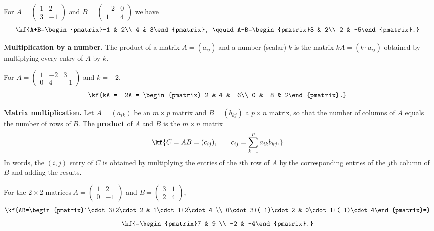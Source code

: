 \vspace{3pt}
\begin{misol}
For $A=\begin{pmatrix}1 & 2\\ 3 & -1\end{pmatrix}$ and
$B=\begin{pmatrix}-2 & 0\\ 1 & 4\end{pmatrix}$ we have
\[\kf{A+B=\begin{pmatrix}-1 & 2\\ 4 & 3\end{pmatrix}, \qquad
A-B=\begin{pmatrix}3 & 2\\ 2 & -5\end{pmatrix}.}\]
\end{misol}
\textbf{Multiplication by a number.}
The product of a matrix $A=(a_{ij})$ and a number (scalar) $k$ is the matrix
$kA=(k\cdot a_{ij})$ obtained by multiplying every entry of $A$ by $k$.
\vspace{3pt}
\begin{misol}
For $A=\begin{pmatrix}1 & -2 & 3\\ 0 & 4 & -1\end{pmatrix}$ and $k=-2$,
\[\kf{kA = -2A = \begin{pmatrix}-2 & 4 & -6\\ 0 & -8 & 2\end{pmatrix}.}\]
\end{misol}
\textbf{Matrix multiplication.}
Let $A=(a_{ik})$ be an $m\times p$ matrix and $B=(b_{kj})$ a $p\times n$ matrix,
so that the number of columns of $A$ equals the number of rows of $B$.
The \textbf{product} of $A$ and $B$ is the $m\times n$ matrix
\[\kf{C = AB = (c_{ij}), \qquad c_{ij}=\sum\limits_{k=1}^{p} a_{ik}b_{kj}.}\]
In words, the $(i,j)$ entry of $C$ is obtained by multiplying the entries of the
$i$th row of $A$ by the corresponding entries of the $j$th column of $B$ and adding
the results.
\vspace{3pt}
\begin{misol}
For the $2\times2$ matrices
$A=\begin{pmatrix}1 & 2\\ 0 & -1\end{pmatrix}$ and
$B=\begin{pmatrix}3 & 1\\ 2 & 4\end{pmatrix}$,
\[\kf{AB=\begin{pmatrix}1\cdot3+2\cdot2 & 1\cdot1+2\cdot4 \\ 0\cdot3+(-1)\cdot2 & 0\cdot1+(-1)\cdot4\end{pmatrix}=}\] \[\kf{=\begin{pmatrix}7 & 9 \\ -2 & -4\end{pmatrix}.}\]
\end{misol}
